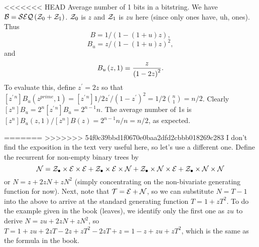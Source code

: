 <<<<<<< HEAD
\vskip 0.08in  Average number of 1 bits in a bitstring.\hfil\break
We have ${\cal B} = {\cal SEQ}\left({\cal Z}_0 + {\cal Z}_1\right)$.  ${\cal Z}_0$
is $z$ and ${\cal Z}_1$ is $zu$ here (since only ones have, uh, ones).
Thus 
$$
 B = 1 / \left(1 - \left(1 + u\right) z\right),
$$
$$
B_u = z / \left(1 - \left(1 + u\right) z\right)^2 ,
$$ 
and
$$
 B_u\left(z, 1\right) = {z \over \left(1 - 2 z\right)^2} .
$$
To evaluate this, define $z^{\prime} = 2 z$ so that $\left[z^{\prime\,n}\right] B_u\left(z^{prime},1\right) =
\left[z^{\prime\, n}\right] 1/2 z^{\prime} / \left(1 - z^{\prime}\right)^2 = 1 / 2 {n \choose 1} = n / 2$.
Clearly $\left[z^n\right] B_u = 2^n \left[z^{\prime\,n}\right] B_u = 2^{n-1} n$.  The
average number of 1s is $\left[z^n\right] B_u\left(z, 1\right) / \left[z^n\right] B\left(z\right) =
2^{n-1} n / n = n / 2$, as expected.

=======
>>>>>>> 54f0c39bbd1f0670e0baa2dfd2cbbb018269c283
\vskip 0.08in  I don't find the exposition in the
text very useful here, so let's use a different one.  Define the recurrent for
non-empty binary trees by
$$
 {\cal N} = {\cal Z}_{\bullet} \times {\cal E} \times {\cal E}
 + {\cal Z}_{\bullet} \times {\cal E} \times {\cal N}
 + {\cal Z}_{\bullet} \times {\cal N} \times {\cal E}
 + {\cal Z}_{\bullet} \times {\cal N} \times {\cal N}
$$
or $N = z + 2 z N + z N^2$ (simply concentrating on the non-bivariate
generating function for now).  Next, note that ${\cal T} = {\cal E} + {\cal N}$,
so we can substitute $N = T - 1$ into the above to arrive at the standard
generating function $T = 1 + z T^2$.  To do the example given in the book
(leaves), we identify only the first one as $z u$ to derive
$N = z u + 2 z N + z N^2$, so $T = 1 + zu + 2 z T - 2z + z T^2 - 2 z T + z =
1 - z + z u + z T^2$, which is the same as the formula in the book.

